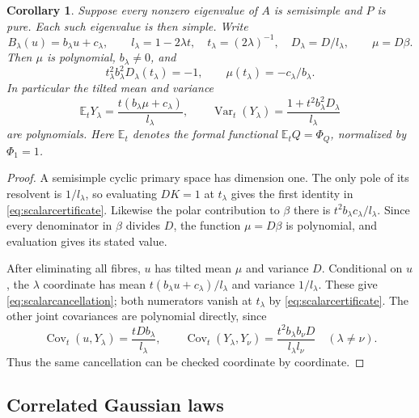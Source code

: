 \documentclass[11pt]{article}
\newtheorem{corollary}[theorem]{Corollary}
\theoremstyle{definition}\newtheorem{definition}[theorem]{Definition}
\theoremstyle{remark}\newtheorem{remark}[theorem]{Remark}
\newcommand{\E}{\mathbb E}
\begin{document}
\begin{corollary}\label{cor:simplecertificates}
Suppose every nonzero eigenvalue of $A$ is semisimple and $P$ is pure.
Each such eigenvalue is then simple. Write
\[
 B_\lambda(u)=b_\lambda u+c_\lambda,\qquad
 l_\lambda=1-2\lambda t,\quad
 t_\lambda=(2\lambda)^{-1},\quad D_\lambda=D/l_\lambda,
 \qquad \mu=D\beta.
\]
Then $\mu$ is polynomial, $b_\lambda\ne0$, and
\begin{equation}\label{eq:scalarcertificate}
 t_\lambda^2b_\lambda^2D_\lambda(t_\lambda)=-1,
 \qquad \mu(t_\lambda)=-c_\lambda/b_\lambda.
\end{equation}
In particular the tilted mean and variance
\begin{equation}\label{eq:scalarcancellation}
 \E_tY_\lambda=
    \frac{t(b_\lambda\mu+c_\lambda)}{l_\lambda},
 \qquad
 \operatorname{Var}_t(Y_\lambda)=
    \frac{1+t^2b_\lambda^2D_\lambda}{l_\lambda}
\end{equation}
are polynomials. Here $\E_t$ denotes the formal functional
$\E_tQ=\Phi_Q$, normalized by $\Phi_1=1$.
\end{corollary}
\begin{proof}
A semisimple cyclic primary space has dimension one. The only pole
of its resolvent is $1/l_\lambda$, so evaluating $DK=1$ at
$t_\lambda$ gives the first identity in \eqref{eq:scalarcertificate}.
Likewise the polar contribution to $\beta$ there is
$t^2b_\lambda c_\lambda/l_\lambda$. Since every denominator
in $\beta$ divides $D$, the function $\mu=D\beta$ is polynomial,
and evaluation gives its stated value.

After eliminating all fibres, $u$ has tilted mean $\mu$ and variance
$D$. Conditional on $u$, the $\lambda$ coordinate has mean
$t(b_\lambda u+c_\lambda)/l_\lambda$ and variance $1/l_\lambda$.
These give \eqref{eq:scalarcancellation}; both numerators vanish at
$t_\lambda$ by \eqref{eq:scalarcertificate}. The other joint
covariances are polynomial directly, since
\[
 \operatorname{Cov}_t(u,Y_\lambda)=\frac{tDb_\lambda}{l_\lambda},
 \qquad
 \operatorname{Cov}_t(Y_\lambda,Y_\nu)=
 \frac{t^2b_\lambda b_\nu D}{l_\lambda l_\nu}\quad(\lambda\ne\nu).
\]
Thus the same cancellation can be checked coordinate by coordinate.
\end{proof}

\subsection{Correlated Gaussian laws}
\end{document}
